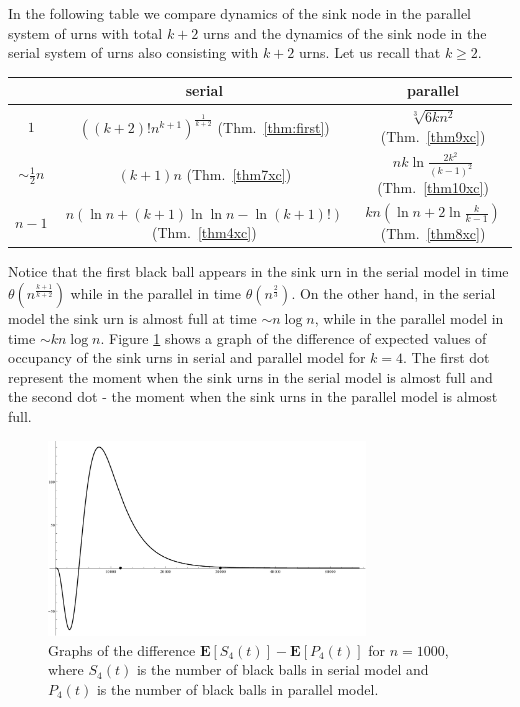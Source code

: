 \documentclass[submission]{dmtcs}
\newcommand{\E}[1]{\mathbf{E}\left[#1\right]}
\begin{document}
In the following table we compare dynamics of the sink node in 
the parallel system of 
urns with total $k+2$ urns and the dynamics of the sink node in the 
serial system of urns also consisting with $k+2$ 
urns. Let us recall that $k\geq 2$.

\begin{center}
\begin{tabular}{|c|c|c|}
\hline
 &serial&parallel\\
\hline
$1$ & $((k+2)! n^{k+1})^{\frac{1}{k+2}}$ (Thm.~\ref{thm:first}) & $\sqrt[3]{6 k n^2}$ (Thm.~\ref{thm9xc})\\
\hline
$\sim\frac12 n$ & $(k+1)n$ (Thm.~\ref{thm7xc})& $n k \ln\frac{2 k^2}{(k-1)^2}$ (Thm.~\ref{thm10xc}) \\
\hline
$n-1$ & $n(\ln n  + (k+1)\ln\ln n - \ln(k+1)!)$ (Thm.~\ref{thm4xc})  & $k n (\ln n  + 2 \ln\frac{k}{k-1})$ (Thm.~\ref{thm8xc})\\
\hline
\end{tabular}
\end{center}

Notice that the first black ball appears in the sink urn in the serial model in time
$\theta(n^{\frac{k+1}{k+2}})$ while in the parallel in time 
$\theta(n^{\frac{2}{3}})$. 
On the other hand, in the serial model the sink urn is almost full at time
$\sim n\log n$, while in the parallel model in time $\sim k n\log n$.
Figure \ref{fig:difference} shows a graph of the difference of expected values 
of occupancy of the sink urns in serial and parallel model for $k=4$.
The first dot represent the moment when the sink urns in the serial model is almost full 
and  the second dot - the moment when the sink urns in the parallel model is almost full.

\begin{figure}[!t]
  \begin{center}
     \includegraphics[width=0.75\textwidth]{Difference.pdf}
  \end{center}
  \caption{
	Graphs of the difference $\E{S_{4}(t)} - \E{P_{4}(t)}$ 
	for $n=1000$, where $S_4(t)$ is the number of black balls 
	in serial model and $P_4(t)$ is the number of black balls 
	in parallel model.
	}
  \label{fig:difference}
\end{figure}
\end{document}
